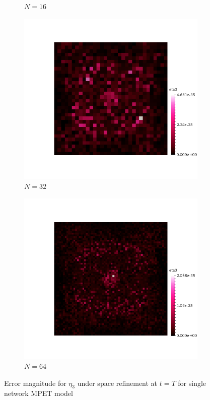\begin{figure}[h!]
\begin{subfigure}[b]{0.24\textwidth}
    \caption{$N=16$}
  \end{subfigure}
  \begin{subfigure}[b]{0.24\textwidth}
    \includegraphics[width=\textwidth,height=\textheight,keepaspectratio,height=\textheight,keepaspectratio]{figures/1_mpet/space/eta3_32.png}
    \caption{$N=32$}
  \end{subfigure}
  \begin{subfigure}[b]{0.24\textwidth}
    \includegraphics[width=\textwidth,height=\textheight,keepaspectratio,height=\textheight,keepaspectratio]{figures/1_mpet/space/eta3_64.png}
    \caption{$N=64$}
  \end{subfigure}
  \caption{Error magnitude for $\eta_3$ under space refinement at $t=T$ for single network MPET model} \label{fig:biot_eta3}
\end{figure}
